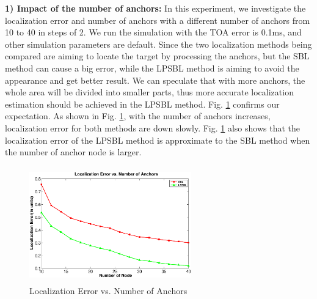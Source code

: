 \textbf{1) Impact of the number of anchors:}
 In this experiment, we investigate the localization error and number of anchors with a different number of anchors from 10 to 40 in steps of 2. 
 We run the simulation with the TOA error is 0.1ms, and other simulation parameters are default. 
 Since the two localization methods being compared are aiming to locate the target by processing the anchors, 
 but the SBL method can cause a big error, while the LPSBL method is aiming to avoid the appearance and get better result. 
 We can speculate that with more anchors, the whole area will be divided into smaller parts, 
 thus more accurate localization estimation should be achieved in the LPSBL method. 
Fig. \ref{fig4} confirms our expectation. As shown in Fig. \ref{fig4}, with the number of anchors increases, localization error for both  methods are down slowly. 
Fig. \ref{fig4} also shows that the localization error of the LPSBL method is approximate to the SBL method when the number of anchor node is larger.
  \begin{figure}[htb]
            \setlength{\abovecaptionskip}{0pt}
			 \vspace{-15mm}
           		 \includegraphics[height=5.0cm,width=7.0cm]{image/fig4.eps}
            \vspace{15mm}
            \caption{Localization Error vs. Number of Anchors}
             \vspace{-5mm}
             \label{fig4}
        \end{figure}	
		
